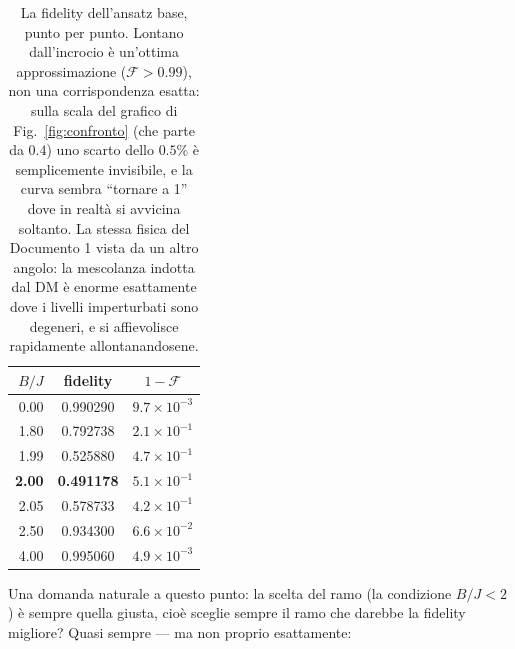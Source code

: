 \documentclass[11pt,a4paper]{article}
\begin{document}
\begin{table}[htbp]
\centering
\small
\renewcommand{\arraystretch}{1.25}
\begin{tabular}{@{}rcc@{}}
\toprule
\rowcolor{grigetto}
$B/J$ & fidelity & $1-\mathcal F$ \\
\midrule
0.00 & 0.990290 & $9.7\times10^{-3}$ \\
1.80 & 0.792738 & $2.1\times10^{-1}$ \\
1.99 & 0.525880 & $4.7\times10^{-1}$ \\
\textbf{2.00} & \textbf{0.491178} & $5.1\times10^{-1}$ \\
2.05 & 0.578733 & $4.2\times10^{-1}$ \\
2.50 & 0.934300 & $6.6\times10^{-2}$ \\
4.00 & 0.995060 & $4.9\times10^{-3}$ \\
\bottomrule
\end{tabular}
\caption{La fidelity dell'ansatz base, punto per punto. Lontano
dall'incrocio è un'ottima approssimazione ($\mathcal F>0.99$), non una
corrispondenza esatta: sulla scala del grafico di Fig.~\ref{fig:confronto}
(che parte da $0.4$) uno scarto dello $0.5\%$ è semplicemente invisibile, e la
curva sembra ``tornare a 1'' dove in realtà si avvicina soltanto. La stessa
fisica del Documento 1 vista da un altro angolo: la mescolanza indotta dal DM è
enorme esattamente dove i livelli imperturbati sono degeneri, e si affievolisce
rapidamente allontanandosene.}
\label{tab:fidelity-branch}
\end{table}

\FloatBarrier

Una domanda naturale a questo punto: la scelta del ramo (la condizione
$B/J<2$) è sempre quella giusta, cioè sceglie sempre il ramo che darebbe la
fidelity migliore? Quasi sempre --- ma non proprio esattamente:
\end{document}
